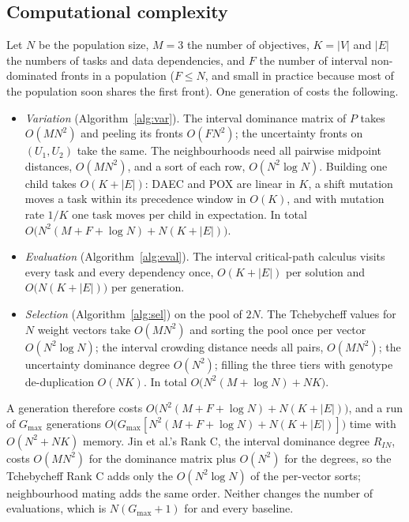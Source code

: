 \subsection{Computational complexity}
\label{sec:complexity}

Let $N$ be the population size, $M = 3$ the number of objectives, $K = |V|$ and $|E|$ the numbers of tasks
and data dependencies, and $F$ the number of interval non-dominated fronts in a population
($F \le N$, and small in practice because most of the population soon shares the first front).
One generation of \ours{} costs the following.

\begin{itemize}
\item \emph{Variation} (Algorithm~\ref{alg:var}). The interval dominance matrix of $P$ takes $O(MN^2)$ and peeling
  its fronts $O(FN^2)$; the uncertainty fronts on $(U_1, U_2)$ take the same. The neighbourhoods need all pairwise
  midpoint distances, $O(MN^2)$, and a sort of each row, $O(N^2 \log N)$. Building one child takes $O(K + |E|)$:
  DAEC and POX are linear in $K$, a shift mutation moves a task within its precedence window in $O(K)$, and with
  mutation rate $1/K$ one task moves per child in expectation. In total $O\big(N^2(M + F + \log N) + N(K + |E|)\big)$.
\item \emph{Evaluation} (Algorithm~\ref{alg:eval}). The interval critical-path calculus visits every task and every
  dependency once, $O(K + |E|)$ per solution and $O\big(N(K + |E|)\big)$ per generation.
\item \emph{Selection} (Algorithm~\ref{alg:sel}) on the pool of $2N$. The Tchebycheff values for $N$ weight vectors take
  $O(MN^2)$ and sorting the pool once per vector $O(N^2 \log N)$; the interval crowding distance needs all pairs,
  $O(MN^2)$; the uncertainty dominance degree $O(N^2)$; filling the three tiers with genotype de-duplication $O(NK)$.
  In total $O\big(N^2(M + \log N) + NK\big)$.
\end{itemize}

A generation therefore costs $O\big(N^2(M + F + \log N) + N(K + |E|)\big)$, and a run of $G_{\max}$ generations
$O\big(G_{\max}[N^2(M + F + \log N) + N(K + |E|)]\big)$ time with $O(N^2 + NK)$ memory. Jin et al.'s Rank C, the
interval dominance degree $R_{IN}$, costs $O(MN^2)$ for the dominance matrix plus $O(N^2)$ for the degrees, so the
Tchebycheff Rank C adds only the $O(N^2 \log N)$ of the per-vector sorts; neighbourhood mating adds the same order.
Neither changes the number of evaluations, which is $N(G_{\max} + 1)$ for \ours{} and every baseline.

